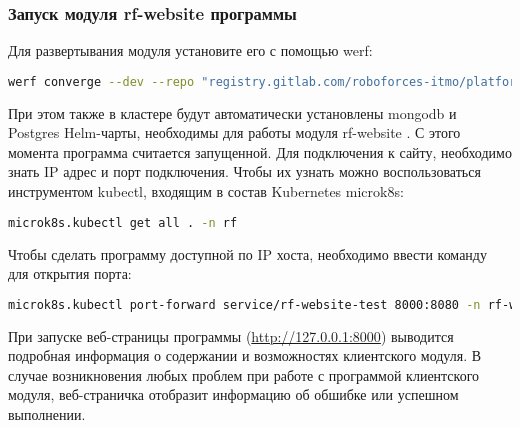 \subsubsection{Запуск модуля rf-website программы \productname}
Для развертывания модуля установите его с помощью werf:
\begin{lstlisting}[language=bash, numbers=none, frame=single]
    werf converge --dev --repo "registry.gitlab.com/roboforces-itmo/platform/rf-website" --env test --set redis.enabled=false
\end{lstlisting}
При этом также в кластере будут автоматически установлены mongodb и Postgres Helm-чарты, необходимы для работы модуля rf-website \productname. 
С этого момента программа считается запущенной. Для подключения к сайту, необходимо знать IP адрес и порт подключения. Чтобы их узнать можно воспользоваться инструментом kubectl, входящим в состав Kubernetes microk8s:
\begin{lstlisting}[language=bash, numbers=none, frame=single]
    microk8s.kubectl get all . -n rf
\end{lstlisting}

Чтобы сделать программу доступной по IP хоста, необходимо ввести команду для открытия порта:
\begin{lstlisting}[language=bash, numbers=none]
    microk8s.kubectl port-forward service/rf-website-test 8000:8080 -n rf-website-test
\end{lstlisting}

При запуске веб-страницы программы (\url{http://127.0.0.1:8000}) выводится подробная информация о содержании и возможностях клиентского модуля. В случае возникновения любых проблем при работе с программой клиентского модуля, веб-страничка отобразит информацию об обшибке или успешном выполнении.


